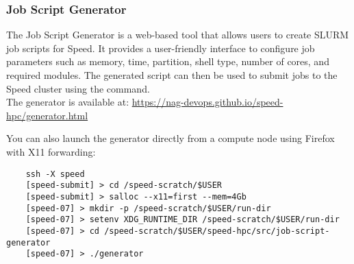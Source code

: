 \subsubsection{Job Script Generator}
\label{sect:job-script-generator}
The Job Script Generator is a web-based tool that allows users to create SLURM job scripts for Speed.
It provides a user-friendly interface to configure job parameters such as memory, time, partition, shell type, number of cores, and required modules.
The generated script can then be used to submit jobs to the Speed cluster using the  command.\\

The generator is available at: \url{https://nag-devops.github.io/speed-hpc/generator.html}

\noindent You can also launch the generator directly from a compute node using Firefox with X11 forwarding:
\scriptsize
\begin{verbatim}
    ssh -X speed
    [speed-submit] > cd /speed-scratch/$USER
    [speed-submit] > salloc --x11=first --mem=4Gb
    [speed-07] > mkdir -p /speed-scratch/$USER/run-dir
    [speed-07] > setenv XDG_RUNTIME_DIR /speed-scratch/$USER/run-dir
    [speed-07] > cd /speed-scratch/$USER/speed-hpc/src/job-script-generator
    [speed-07] > ./generator
\end{verbatim}
\normalsize

